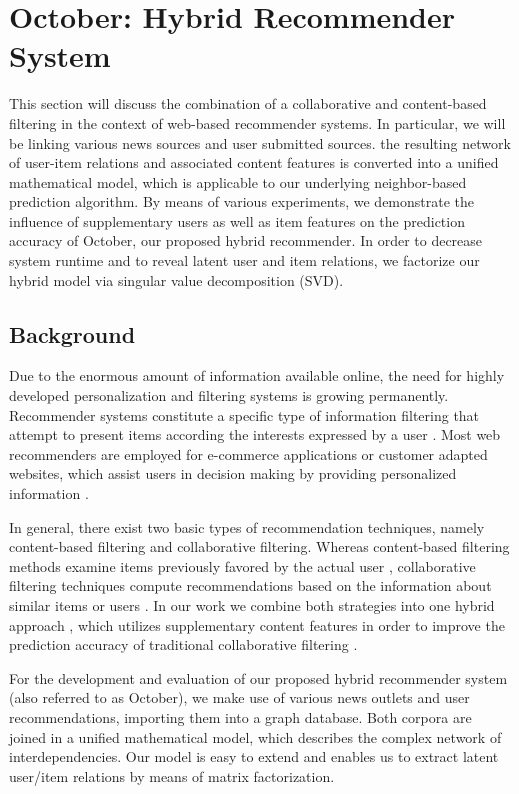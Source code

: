 \documentclass[11pt,letterpaper]{article}
\begin{document}
\newpage


\section{October: Hybrid Recommender System}

This section will discuss the combination of a collaborative and content-based filtering in the context of web-based recommender systems. In particular, we will be linking various news sources and user submitted sources. the resulting network of user-item relations and associated content features is converted into a unified mathematical model, which is applicable to our underlying neighbor-based prediction algorithm. By means of various experiments, we demonstrate the influence of supplementary users as well as item features on the prediction accuracy of October, our proposed hybrid recommender. In order to decrease system runtime and to reveal latent user and item relations, we factorize our hybrid model via singular value decomposition (SVD).\\

\subsection{Background}

Due to the enormous amount of information available online, the need for highly developed personalization and filtering systems is growing permanently. Recommender systems constitute a specific type of information filtering that attempt to present items according the interests expressed by a user \cite{1}. Most web recommenders are employed for e-commerce applications or customer adapted websites, which assist users in decision making by providing personalized information \cite{5}.

In general, there exist two basic types of recommendation techniques, namely content-based filtering and collaborative filtering. Whereas content-based filtering methods examine items previously favored by the actual user \cite{7}, collaborative filtering techniques compute recommendations based on the information about similar items or users \cite{10}. In our work we combine both strategies into one hybrid approach \cite{3}, which utilizes supplementary content features in order to improve the prediction accuracy of traditional collaborative filtering \cite{6, 11}.

For the development and evaluation of our proposed hybrid recommender system (also referred to as October), we make use of various news outlets and user recommendations, importing them into a graph database. Both corpora are joined in a unified mathematical model, which describes the complex network of interdependencies. Our model is easy to extend and enables us to extract latent user/item relations by means of matrix factorization.
\end{document}
